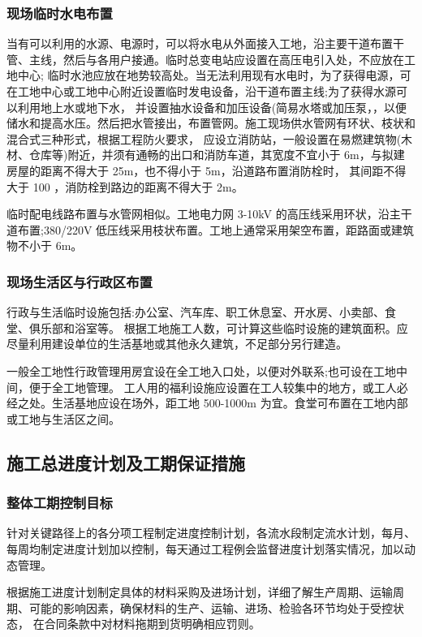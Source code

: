 \subsubsection{现场临时水电布置}


当有可以利用的水源、电源时，可以将水电从外面接入工地，沿主要干道布置干管、主线，然后与各用户接通。临时总变电站应设置在高压电引入处，不应放在工地中心;
临时水池应放在地势较高处。当无法利用现有水电时，为了获得电源，可在工地中心或工地中心附近设置临时发电设备，沿干道布置主线;为了获得水源可以利用地上水或地下水，
并设置抽水设备和加压设备(简易水塔或加压泵，，以便储水和提高水压。然后把水管接出，布置管网。施工现场供水管网有环状、枝状和混合式三种形式，根据工程防火要求，
应设立消防站，一般设置在易燃建筑物(木材、仓库等)附近，并须有通畅的出口和消防车道，其宽度不宜小于 6m，与拟建房屋的距离不得大于 25m，也不得小于 5m，沿道路布置消防栓时，
其间距不得大于 100 ，消防栓到路边的距离不得大于 2m。

临时配电线路布置与水管网相似。工地电力网 3-10kV 的高压线采用环状，沿主干道布置;380/220V 低压线采用枝状布置。工地上通常采用架空布置，距路面或建筑物不小于 6m。

\subsubsection{现场生活区与行政区布置}


行政与生活临时设施包括:办公室、汽车库、职工休息室、开水房、小卖部、食堂、俱乐部和浴室等。
根据工地施工人数，可计算这些临时设施的建筑面积。应尽量利用建设单位的生活基地或其他永久建筑，不足部分另行建造。

一般全工地性行政管理用房宜设在全工地入口处，以便对外联系;也可设在工地中间，便于全工地管理。
工人用的福利设施应设置在工人较集中的地方，或工人必经之处。生活基地应设在场外，距工地 500-1000m 为宜。食堂可布置在工地内部或工地与生活区之间。

\subsection{施工总进度计划及工期保证措施}
\subsubsection{整体工期控制目标}


针对关键路径上的各分项工程制定进度控制计划，各流水段制定流水计划，每月、每周均制定进度计划加以控制，每天通过工程例会监督进度计划落实情况，加以动态管理。 

根据施工进度计划制定具体的材料采购及进场计划，详细了解生产周期、运输周期、可能的影响因素，确保材料的生产、运输、进场、检验各环节均处于受控状态，
在合同条款中对材料拖期到货明确相应罚则。

